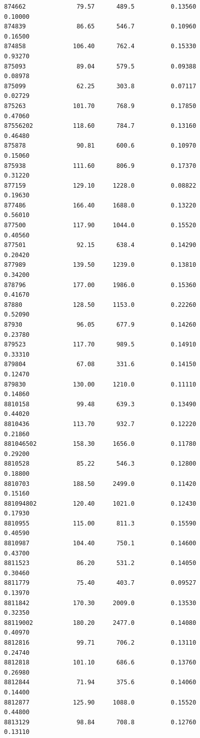 \documentclass[
  letterpaper,
  DIV=11,
  numbers=noendperiod]{scrartcl}
\begin{document}
\begin{verbatim}
874662              79.57      489.5          0.13560           0.10000
874839              86.65      546.7          0.10960           0.16500
874858             106.40      762.4          0.15330           0.93270
875093              89.04      579.5          0.09388           0.08978
875099              62.25      303.8          0.07117           0.02729
875263             101.70      768.9          0.17850           0.47060
87556202           118.60      784.7          0.13160           0.46480
875878              90.81      600.6          0.10970           0.15060
875938             111.60      806.9          0.17370           0.31220
877159             129.10     1228.0          0.08822           0.19630
877486             166.40     1688.0          0.13220           0.56010
877500             117.90     1044.0          0.15520           0.40560
877501              92.15      638.4          0.14290           0.20420
877989             139.50     1239.0          0.13810           0.34200
878796             177.00     1986.0          0.15360           0.41670
87880              128.50     1153.0          0.22260           0.52090
87930               96.05      677.9          0.14260           0.23780
879523             117.70      989.5          0.14910           0.33310
879804              67.08      331.6          0.14150           0.12470
879830             130.00     1210.0          0.11110           0.14860
8810158             99.48      639.3          0.13490           0.44020
8810436            113.70      932.7          0.12220           0.21860
881046502          158.30     1656.0          0.11780           0.29200
8810528             85.22      546.3          0.12800           0.18800
8810703            188.50     2499.0          0.11420           0.15160
881094802          120.40     1021.0          0.12430           0.17930
8810955            115.00      811.3          0.15590           0.40590
8810987            104.40      750.1          0.14600           0.43700
8811523             86.20      531.2          0.14050           0.30460
8811779             75.40      403.7          0.09527           0.13970
8811842            170.30     2009.0          0.13530           0.32350
88119002           180.20     2477.0          0.14080           0.40970
8812816             99.71      706.2          0.13110           0.24740
8812818            101.10      686.6          0.13760           0.26980
8812844             71.94      375.6          0.14060           0.14400
8812877            125.90     1088.0          0.15520           0.44800
8813129             98.84      708.8          0.12760           0.13110

\end{verbatim}
\end{document}
